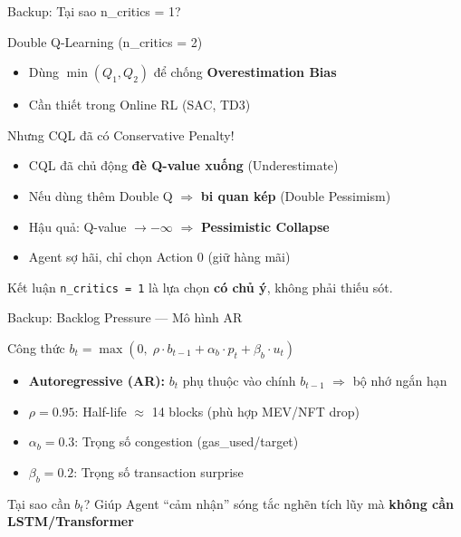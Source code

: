 \documentclass[aspectratio=169, 12pt, xcolor=table]{beamer}
\begin{document}
\begin{frame}{Backup: Tại sao n\_critics = 1?}
  \begin{block}{Double Q-Learning (n\_critics = 2)}
    \begin{itemize}
      \item Dùng $\min(Q_1, Q_2)$ để chống \textbf{Overestimation Bias}
      \item Cần thiết trong Online RL (SAC, TD3)
    \end{itemize}
  \end{block}

  \begin{alertblock}{Nhưng CQL đã có Conservative Penalty!}
    \begin{itemize}
      \item CQL đã chủ động \textbf{đè Q-value xuống} (Underestimate)
      \item Nếu dùng thêm Double Q $\Rightarrow$ \textbf{bi quan kép} (Double Pessimism)
      \item Hậu quả: Q-value $\to -\infty$ $\Rightarrow$ \textbf{Pessimistic Collapse}
      \item Agent sợ hãi, chỉ chọn Action 0 (giữ hàng mãi)
    \end{itemize}
  \end{alertblock}

  \begin{block}{Kết luận}
    \texttt{n\_critics = 1} là lựa chọn \textbf{có chủ ý}, không phải thiếu sót.
  \end{block}
\end{frame}

\begin{frame}{Backup: Backlog Pressure — Mô hình AR}
  \begin{block}{Công thức}
    $b_t = \max(0, \; \rho \cdot b_{t-1} + \alpha_b \cdot p_t + \beta_b \cdot u_t)$
  \end{block}

  \begin{itemize}
    \item \textbf{Autoregressive (AR):} $b_t$ phụ thuộc vào chính $b_{t-1}$ $\Rightarrow$ bộ nhớ ngắn hạn
    \item $\rho = 0.95$: Half-life $\approx$ 14 blocks (phù hợp MEV/NFT drop)
    \item $\alpha_b = 0.3$: Trọng số congestion (gas\_used/target)
    \item $\beta_b = 0.2$: Trọng số transaction surprise
  \end{itemize}

  \begin{block}{Tại sao cần $b_t$?}
    Giúp Agent ``cảm nhận'' sóng tắc nghẽn tích lũy mà \textbf{không cần LSTM/Transformer}
  \end{block}
\end{frame}
\end{document}
